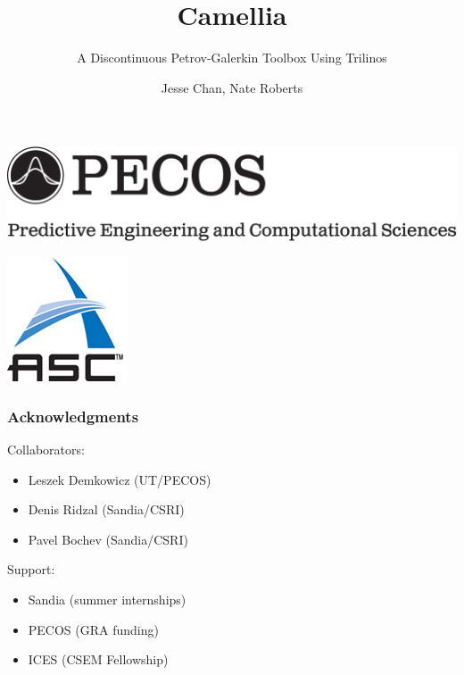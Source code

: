 \documentclass[mathserif]{beamer}
\author{Jesse Chan, Nate Roberts}
\institute{The University of Texas at Austin}
\title[Camellia]{Camellia}
\subtitle{A Discontinuous Petrov-Galerkin Toolbox Using Trilinos}
\begin{document}
\begin{frame}
\begin{center}
\includegraphics[width=.8\linewidth]{grand_logo}\\
\end{center}
\titlepage
\begin{flushright}
\includegraphics[scale=0.1]{asc_logo}\\
\end{flushright}
\end{frame}

\begin{frame}
\frametitle{Acknowledgments}

Collaborators:
\begin{itemize}
\item Leszek Demkowicz (UT/PECOS)
\item Denis Ridzal (Sandia/CSRI)
\item Pavel Bochev (Sandia/CSRI)
\end{itemize}

Support:
\begin{itemize}
\item Sandia (summer internships)
\item PECOS (GRA funding)
\item ICES (CSEM Fellowship)
\end{itemize}

\end{frame}
\end{document}
